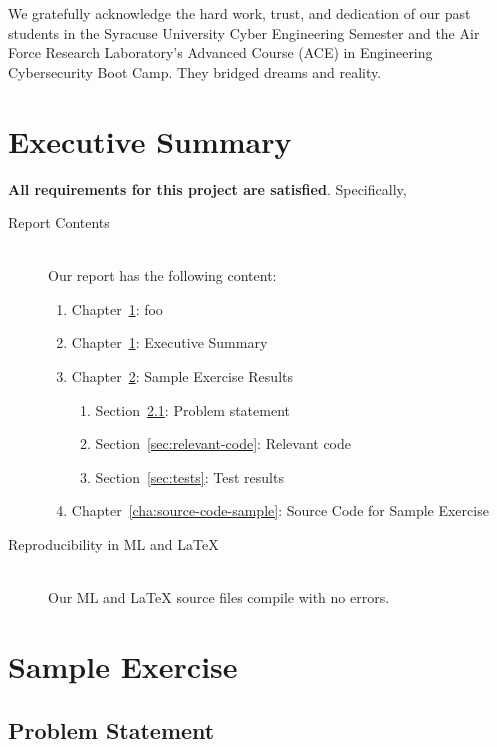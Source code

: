 \documentclass{report}
\begin{document}
\begin{acknowledgments}
  We gratefully acknowledge the hard work, trust, and dedication of
  our past students in the Syracuse University Cyber Engineering
  Semester and the Air Force Research Laboratory's Advanced Course
  (ACE) in Engineering Cybersecurity Boot Camp.  They bridged dreams
  and reality.
\end{acknowledgments}

\tableofcontents{}

\chapter{Executive Summary}
\label{cha:executive-summary}

\textbf{All requirements for this project are satisfied}.
Specifically,
\begin{description}
\item[Report Contents] \ \\
  Our report has the following content:
  \begin{enumerate}[{}]
  \item Chapter~\ref{cha:executive-summary}: foo
  \item Chapter~\ref{cha:executive-summary}: Executive Summary
  \item Chapter~\ref{cha:sample-exercise}: Sample Exercise Results
    \begin{enumerate}[{}]
    \item Section~\ref{sec:problem-statement}: Problem statement
    \item Section~\ref{sec:relevant-code}: Relevant code
    \item Section~\ref{sec:tests}: Test results
    \end{enumerate}
  \item Chapter~\ref{cha:source-code-sample}: Source Code for Sample
    Exercise
  \end{enumerate}
\item[Reproducibility in ML and \LaTeX{}] \ \\
  Our ML and \LaTeX{} source files compile with no errors.
\end{description}

\chapter{Sample Exercise}
\label{cha:sample-exercise}

\section{Problem Statement}
\label{sec:problem-statement}
\end{document}
